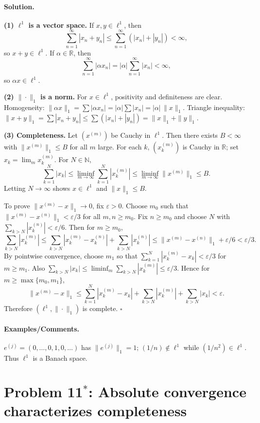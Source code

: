 \documentclass[12pt,a4paper]{article}
\newcommand{\qed}{\hfill$\square$}
\theoremstyle{plain}
\theoremstyle{definition}
\theoremstyle{remark}
\theoremstyle{remark}
\begin{document}
\paragraph{Solution.}

\textbf{(1) $\ell^1$ is a vector space.}
If $x,y\in\ell^1$, then
\[
\sum_{n=1}^\infty |x_n+y_n|\le \sum_{n=1}^\infty (|x_n|+|y_n|)<\infty,
\]
so $x+y\in\ell^1$.
If $\alpha\in\mathbb{R}$, then
\[
\sum_{n=1}^\infty |\alpha x_n|=|\alpha|\sum_{n=1}^\infty |x_n|<\infty,
\]
so $\alpha x\in\ell^1$.

\textbf{(2) $\|\cdot\|_1$ is a norm.}
For $x\in\ell^1$, positivity and definiteness are clear.
Homogeneity:
$\|\alpha x\|_1=\sum|\alpha x_n|=|\alpha|\sum|x_n|=|\alpha|\,\|x\|_1$.
Triangle inequality:
$\|x+y\|_1=\sum|x_n+y_n|\le \sum(|x_n|+|y_n|)=\|x\|_1+\|y\|_1$.

\textbf{(3) Completeness.}
Let $(x^{(m)})$ be Cauchy in $\ell^1$.
Then there exists $B<\infty$ with $\|x^{(m)}\|_1\le B$ for all $m$ large.
For each $k$, $(x^{(m)}_k)$ is Cauchy in $\mathbb{R}$; set $x_k=\lim_m x^{(m)}_k$.
For $N\in\mathbb{N}$,
\[
\sum_{k=1}^N |x_k| \le \liminf_{m\to\infty} \sum_{k=1}^N |x^{(m)}_k|
\le \liminf_{m\to\infty} \|x^{(m)}\|_1 \le B.
\]
Letting $N\to\infty$ shows $x\in\ell^1$ and $\|x\|_1\le B$.

To prove $\|x^{(m)}-x\|_1\to 0$, fix $\varepsilon>0$.
Choose $m_0$ such that $\|x^{(m)}-x^{(n)}\|_1<\varepsilon/3$ for all $m,n\ge m_0$.
Fix $n\ge m_0$ and choose $N$ with $\sum_{k>N}|x^{(n)}_k|<\varepsilon/6$.
Then for $m\ge m_0$,
\[
\sum_{k>N}|x^{(m)}_k|
\le \sum_{k>N}|x^{(m)}_k-x^{(n)}_k| + \sum_{k>N}|x^{(n)}_k|
\le \|x^{(m)}-x^{(n)}\|_1 + \varepsilon/6 < \varepsilon/3.
\]
By pointwise convergence, choose $m_1$ so that $\sum_{k=1}^N |x^{(m)}_k-x_k|<\varepsilon/3$ for $m\ge m_1$.
Also $\sum_{k>N}|x_k|\le \liminf_{m}\sum_{k>N}|x^{(m)}_k|\le \varepsilon/3$.
Hence for $m\ge \max\{m_0,m_1\}$,
\[
\|x^{(m)}-x\|_1
\le \sum_{k=1}^N |x^{(m)}_k-x_k| + \sum_{k>N}|x^{(m)}_k| + \sum_{k>N}|x_k| < \varepsilon.
\]
Therefore $(\ell^1,\|\cdot\|_1)$ is complete.
\qed

\paragraph{Examples/Comments.}
$e^{(j)}=(0,\dots,0,1,0,\dots)$ has $\|e^{(j)}\|_1=1$; $(1/n)\notin\ell^1$ while $(1/n^2)\in\ell^1$.
Thus $\ell^1$ is a Banach space.

\section*{Problem 11$^*$: Absolute convergence characterizes completeness}
\end{document}
